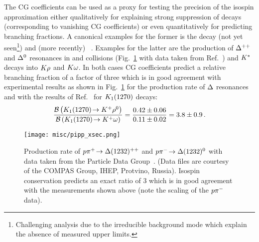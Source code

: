 The CG coefficients can be used as a proxy for testing the precision of the isospin approximation either qualitatively for explaining strong suppression of decays (corresponding to vanishing CG coefficients) or even quantitatively for predicting branching fractions.
A canonical examples for the former is the decay \decay{\rhoz}{\piz\piz} (not yet seen\footnote{Challenging analysis due to the irreducible background mode \decay{\rhoz}{\piz\piz\g} which explain the absence of measured upper limits.}) and (more recently) \decay{\Lb}{\jpsi\Sz}~\cite{IsospinInLbToJpsiLz}.
Examples for the latter are the production of $\PDelta^{++}$ and $\PDelta^0$ resonances in \proton \pim and \proton \pip collisions (\cf Fig.~\ref{fig:ppiTotalSigma} with data taken from Ref.~\cite{ppiTotalSigma}) and $\Kstar$ decays into $\kaon\Prho$ and $\kaon\Pomega$.
In both cases CG coefficients predict a relative branching fraction of a factor of three which is in good agreement with experimental results as shown in Fig.~\ref{fig:ppiTotalSigma} for the production rate of $\PDelta$ resonances and with the results of Ref.~\cite{KstarToKrhoKomega} for $\PK_1(1270)$ decays:
\begin{equation*}
    \frac{\BR \left(\decay{\PK_1(1270)}{\Kp\rhoz} \right)}{\BR \left(\decay{\PK_1(1270)}{\Kp\Pomega} \right)} = \frac{\num{.42 \pm .06}}{\num{.11 \pm .02}} = \num{3.8 \pm .9} \,.
\end{equation*}

\begin{figure}[htbp]
    \centering
    \texttt{[image: misc/pipp\_xsec.png]}
    \caption{Production rate of $\decay{\proton\pip}{\PDelta(1232)^{++}}$ and $\decay{\proton\pim}{\PDelta(1232)^0}$ with data taken from the Particle Data Group~\cite{ppiTotalSigma}. (Data files are courtesy of the COMPAS Group, IHEP, Protvino, Russia). Isospin conservation predicts an exact ratio of $3$ which is in good agreement with the measurements shown above (note the scaling of the $\proton\pim$ data).}
    \label{fig:ppiTotalSigma}
\end{figure}

